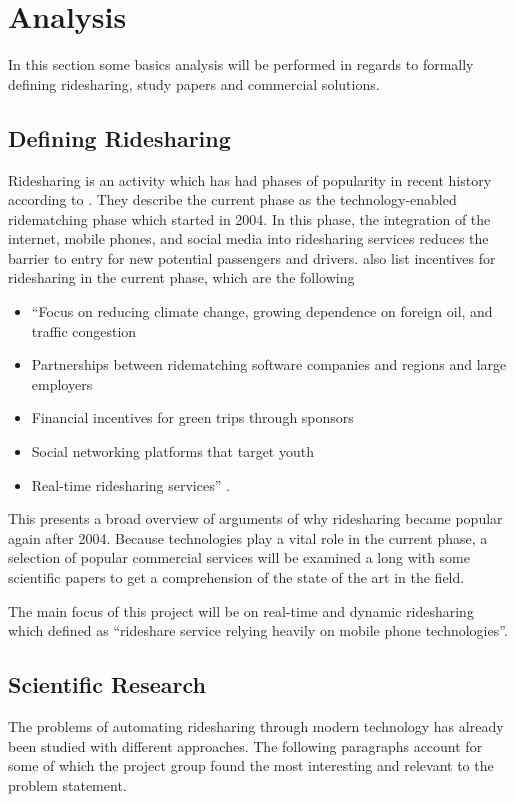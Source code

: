 \section{Analysis}
In this section some basics analysis will be performed in regards to formally defining ridesharing, study papers and commercial solutions. 

\subsection{Defining Ridesharing}
Ridesharing is an activity which has had phases of popularity in recent history according to \citet{doi:10.1080/01441647.2011.621557}.
They describe the current phase as the technology-enabled ridematching phase which started in 2004.
In this phase, the integration of the internet, mobile phones, and social media into ridesharing services reduces the barrier to entry for new potential passengers and drivers.
\citet{doi:10.1080/01441647.2011.621557} also list incentives for ridesharing in the current phase, which are the following 

\begin{itemize}
  \item ``Focus on reducing climate change, growing dependence on foreign oil, and traffic congestion
  \item Partnerships between ridematching software companies and regions and large employers
  \item Financial incentives for green trips through sponsors
  \item Social networking platforms that target youth
  \item Real-time ridesharing services'' \citep{doi:10.1080/01441647.2011.621557}.
\end{itemize}

This presents a broad overview of arguments of why ridesharing became popular again after 2004.
Because technologies play a vital role in the current phase, a selection of popular commercial services will be examined a long with some scientific papers to get a comprehension of the state of the art in the field.

The main focus of this project will be on real-time and dynamic ridesharing which \citet{amey2011real} defined as ``rideshare service relying heavily on mobile phone technologies''.

\subsection{Scientific Research}
The problems of automating ridesharing through modern technology has already been studied with different approaches.
The following paragraphs account for some of which the project group found the most interesting and relevant to the problem statement. 

